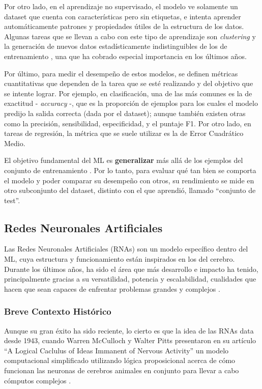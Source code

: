 \documentclass[../../main.tex]{subfiles}
\begin{document}
Por otro lado, en el aprendizaje no supervisado, el modelo ve solamente un dataset que cuenta con características pero sin etiquetas, e intenta aprender automáticamente patrones y propiedades útiles de la estructura de los datos. Algunas tareas que se llevan a cabo con este tipo de aprendizaje son \textit{clustering} y la generación de nuevos datos estadísticamente indistinguibles de los de entrenamiento \cite{prince2024understanding}, una que ha cobrado especial importancia en los últimos años.

Por último, para medir el desempeño de estos modelos, se definen métricas cuantitativas que dependen de la tarea que se esté realizando y del objetivo que se intente lograr. Por ejemplo, en clasificación, una de las más comunes es la de exactitud - \textit{accuracy} -, que es la proporción de ejemplos para los cuales el modelo predijo la salida correcta (dada por el dataset); aunque también existen otras como la precisión, sensibilidad, especificidad, y el puntaje F1. Por otro lado, en tareas de regresión, la métrica que se suele utilizar es la de Error Cuadrático Medio. 

El objetivo fundamental del ML es \textbf{generalizar} más allá de los ejemplos del conjunto de entrenamiento \cite{pedro-domingos}. Por lo tanto, para evaluar qué tan bien se comporta el modelo y poder comparar su desempeño con otros, su rendimiento se mide en otro subconjunto del dataset, distinto con el que aprendió, llamado ``conjunto de test''.

\subsection{Redes Neuronales Artificiales}
Las Redes Neuronales Artificiales (RNAs) son un modelo específico dentro del ML, cuya estructura y funcionamiento están inspirados en los del cerebro. Durante los últimos años, ha sido el área que más desarrollo e impacto ha tenido, principalmente gracias a su versatilidad, potencia y escalabilidad, cualidades que hacen que sean capaces de enfrentar problemas grandes y complejos \cite{hands-on-ML-sklearn-tf}.

\subsubsection{Breve Contexto Histórico}
Aunque su gran éxito ha sido reciente, lo cierto es que la idea de las RNAs data desde 1943, cuando Warren McCulloch y Walter Pitts presentaron en su artículo ``A Logical Caclulus of Ideas Immanent of Nervous Activity'' un modelo computacional simplificado utilizando lógica proposicional acerca de cómo funcionan las neuronas de cerebros animales en conjunto para llevar a cabo cómputos complejos \cite{hands-on-ML-sklearn-tf}. 
\end{document}
